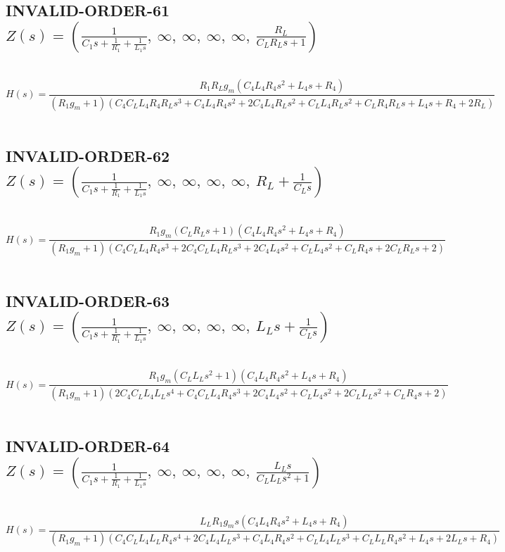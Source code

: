 \documentclass{article}
\begin{document}
\subsection{INVALID-ORDER-61 $Z(s) = \left( \frac{1}{C_{1} s + \frac{1}{R_{1}} + \frac{1}{L_{1} s}}, \  \infty, \  \infty, \  \infty, \  \infty, \  \frac{R_{L}}{C_{L} R_{L} s + 1}\right)$ } \ 
\textbf{\[H(s) = \frac{R_{1} R_{L} g_{m} \left(C_{4} L_{4} R_{4} s^{2} + L_{4} s + R_{4}\right)}{\left(R_{1} g_{m} + 1\right) \left(C_{4} C_{L} L_{4} R_{4} R_{L} s^{3} + C_{4} L_{4} R_{4} s^{2} + 2 C_{4} L_{4} R_{L} s^{2} + C_{L} L_{4} R_{L} s^{2} + C_{L} R_{4} R_{L} s + L_{4} s + R_{4} + 2 R_{L}\right)}\] } \ 
\subsection{INVALID-ORDER-62 $Z(s) = \left( \frac{1}{C_{1} s + \frac{1}{R_{1}} + \frac{1}{L_{1} s}}, \  \infty, \  \infty, \  \infty, \  \infty, \  R_{L} + \frac{1}{C_{L} s}\right)$ } \ 
\textbf{\[H(s) = \frac{R_{1} g_{m} \left(C_{L} R_{L} s + 1\right) \left(C_{4} L_{4} R_{4} s^{2} + L_{4} s + R_{4}\right)}{\left(R_{1} g_{m} + 1\right) \left(C_{4} C_{L} L_{4} R_{4} s^{3} + 2 C_{4} C_{L} L_{4} R_{L} s^{3} + 2 C_{4} L_{4} s^{2} + C_{L} L_{4} s^{2} + C_{L} R_{4} s + 2 C_{L} R_{L} s + 2\right)}\] } \ 
\subsection{INVALID-ORDER-63 $Z(s) = \left( \frac{1}{C_{1} s + \frac{1}{R_{1}} + \frac{1}{L_{1} s}}, \  \infty, \  \infty, \  \infty, \  \infty, \  L_{L} s + \frac{1}{C_{L} s}\right)$ } \ 
\textbf{\[H(s) = \frac{R_{1} g_{m} \left(C_{L} L_{L} s^{2} + 1\right) \left(C_{4} L_{4} R_{4} s^{2} + L_{4} s + R_{4}\right)}{\left(R_{1} g_{m} + 1\right) \left(2 C_{4} C_{L} L_{4} L_{L} s^{4} + C_{4} C_{L} L_{4} R_{4} s^{3} + 2 C_{4} L_{4} s^{2} + C_{L} L_{4} s^{2} + 2 C_{L} L_{L} s^{2} + C_{L} R_{4} s + 2\right)}\] } \ 
\subsection{INVALID-ORDER-64 $Z(s) = \left( \frac{1}{C_{1} s + \frac{1}{R_{1}} + \frac{1}{L_{1} s}}, \  \infty, \  \infty, \  \infty, \  \infty, \  \frac{L_{L} s}{C_{L} L_{L} s^{2} + 1}\right)$ } \ 
\textbf{\[H(s) = \frac{L_{L} R_{1} g_{m} s \left(C_{4} L_{4} R_{4} s^{2} + L_{4} s + R_{4}\right)}{\left(R_{1} g_{m} + 1\right) \left(C_{4} C_{L} L_{4} L_{L} R_{4} s^{4} + 2 C_{4} L_{4} L_{L} s^{3} + C_{4} L_{4} R_{4} s^{2} + C_{L} L_{4} L_{L} s^{3} + C_{L} L_{L} R_{4} s^{2} + L_{4} s + 2 L_{L} s + R_{4}\right)}\] } \ 
\end{document}
